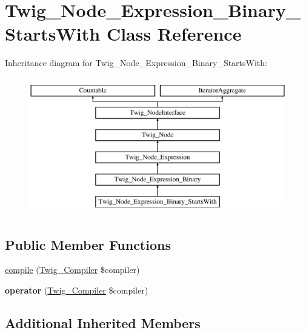 \hypertarget{class_twig___node___expression___binary___starts_with}{}\section{Twig\+\_\+\+Node\+\_\+\+Expression\+\_\+\+Binary\+\_\+\+Starts\+With Class Reference}
\label{class_twig___node___expression___binary___starts_with}
Inheritance diagram for Twig\+\_\+\+Node\+\_\+\+Expression\+\_\+\+Binary\+\_\+\+Starts\+With\+:\begin{figure}[H]
\begin{center}
\leavevmode
\includegraphics[height=6.000000cm]{class_twig___node___expression___binary___starts_with}
\end{center}
\end{figure}
\subsection*{Public Member Functions}
\begin{DoxyCompactItemize}
\item 
\hyperlink{class_twig___node___expression___binary___starts_with_a4e0faa87c3fae583620b84d3607085da}{compile} (\hyperlink{class_twig___compiler}{Twig\+\_\+\+Compiler} \$compiler)
\item 
\hypertarget{class_twig___node___expression___binary___starts_with_af77318ec88d5f8a508684970a150b670}{}{\bfseries operator} (\hyperlink{class_twig___compiler}{Twig\+\_\+\+Compiler} \$compiler)\label{class_twig___node___expression___binary___starts_with_af77318ec88d5f8a508684970a150b670}

\end{DoxyCompactItemize}
\subsection*{Additional Inherited Members}


